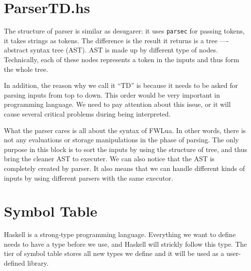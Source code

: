 \section{ParserTD.hs}
The structure of parser is similar as desugarer: it uses {\tt parsec} for passing tokens, it takes strings as tokens. The difference is the result it returns is a tree ---- abstract syntax tree (AST).
AST is made up by different type of nodes. Technically, each of these nodes represents a token in the inputs and thus form the whole tree.

In addition, the reason why we call it ``TD'' is because it needs to be asked for parsing inputs from top to down. This order would be very important in programming language. We need to pay attention about this issue, or it will cause several critical problems during being interpreted.

What the parser cares is all about the syntax of FWLua. In other words, there is not any evaluations or storage manipulations in the phase of parsing. The only purpose in this block is to sort the inputs by using the structure of tree, and thus bring the cleaner AST to executer. We can also notice that the AST is completely created by parser. It also means that we can handle different kinds of inputs by using different parsers with the same executor.

\section{Symbol Table}
Haskell is a strong-type programming language. Everything we want to define needs to have a type before we use, and Haskell will strickly follow this type. The tier of symbol table stores all new types we define and it will be used as a user-defined library.

